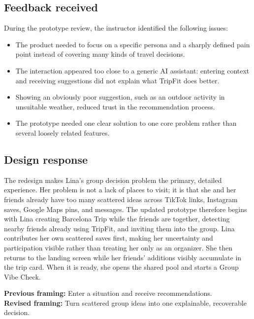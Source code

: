 \documentclass[11pt,a4paper]{article}
\begin{document}
\subsection{Feedback received}

During the prototype review, the instructor identified the following issues:

\begin{itemize}[leftmargin=1.5em, itemsep=0.15em]
    \item The product needed to focus on a specific persona and a sharply defined pain point instead of covering many kinds of travel decisions.
    \item The interaction appeared too close to a generic AI assistant: entering context and receiving suggestions did not explain what TripFit does better.
    \item Showing an obviously poor suggestion, such as an outdoor activity in unsuitable weather, reduced trust in the recommendation process.
    \item The prototype needed one clear solution to one core problem rather than several loosely related features.
\end{itemize}

\subsection{Design response}

The redesign makes Lina's group decision problem the primary, detailed experience. Her problem is not a lack of places to visit; it is that she and her friends already have too many scattered ideas across TikTok links, Instagram saves, Google Maps pins, and messages. The updated prototype therefore begins with Lina creating Barcelona Trip while the friends are together, detecting nearby friends already using TripFit, and inviting them into the group. Lina contributes her own scattered saves first, making her uncertainty and participation visible rather than treating her only as an organizer. She then returns to the landing screen while her friends' additions visibly accumulate in the trip card. When it is ready, she opens the shared pool and starts a Group Vibe Check.

\begin{tripfitbox}
\textbf{Previous framing:} Enter a situation and receive recommendations.\\
\textbf{Revised framing:} Turn scattered group ideas into one explainable, recoverable decision.
\end{tripfitbox}
\end{document}
